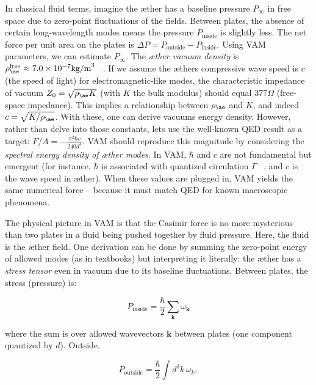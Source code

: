 \documentclass[a4paper, aps,preprint,superscriptaddress, 12pt]{revtex4}
\begin{document}
In classical fluid terms, imagine the æther has a baseline pressure $P_{\infty}$ in free space due to zero-point fluctuations of the fields. Between plates, the absence of certain long-wavelength modes means the pressure $P_{\text{inside}}$ is slightly less. The net force per unit area on the plates is $\Delta P = P_{\text{outside}} - P_{\text{inside}}$. Using VAM parameters, we can estimate $P_{\infty}$. The \textit{æther vacuum density} is $\rho_{\ae}^{\text{free}}\approx7.0\times10^{-7}\text{kg/m}^3$~\cite{VAM_constants} . If we assume the æther\rqs s compressive wave speed is $c$ (the speed of light) for electromagnetic-like modes, the characteristic impedance of vacuum $Z_0 = \sqrt{\rho_{\ae}K}$ (with $K$ the bulk modulus) should equal $377\Omega$ (free-space impedance). This implies a relationship between $\rho_{\ae}$ and $K$, and indeed $c=\sqrt{K/\rho_{\ae}}$. With these, one can derive vacuum\rqs s energy density. However, rather than delve into those constants, let\rqs s use the well-known QED result as a target: $F/A = -\frac{\pi^2 \hbar c}{240 d^4}$. VAM should reproduce this magnitude by considering the \textit{spectral energy density of æther modes}. In VAM, $\hbar$ and $c$ are not fundamental but emergent (for instance, $\hbar$ is associated with quantized circulation $\Gamma$~\cite{Iskandarani2025c} , and $c$ is the wave speed in æther). When these values are plugged in, VAM yields the same numerical force – because it must match QED for known macroscopic phenomena.


The physical picture in VAM is that the Casimir force is no more mysterious than two plates in a fluid being pushed together by fluid pressure. Here, the fluid is the æther field. One derivation can be done by summing the zero-point energy of allowed modes (as in textbooks) but interpreting it literally: the æther has a \textit{stress tensor} even in vacuum due to its baseline fluctuations. Between plates, the stress (pressure) is:

\begin{equation}
    P_{\text{inside}} = \frac{\hbar}{2}\sum_{\mathbf{k}}\omega_{\mathbf{k}}
\end{equation}

where the sum is over allowed wavevectors $\mathbf{k}$ between plates (one component quantized by $d$). Outside,

\begin{equation}
    P_{\text{outside}} = \frac{\hbar}{2}\int d^3k\,\omega_{k},
\end{equation}
\end{document}
